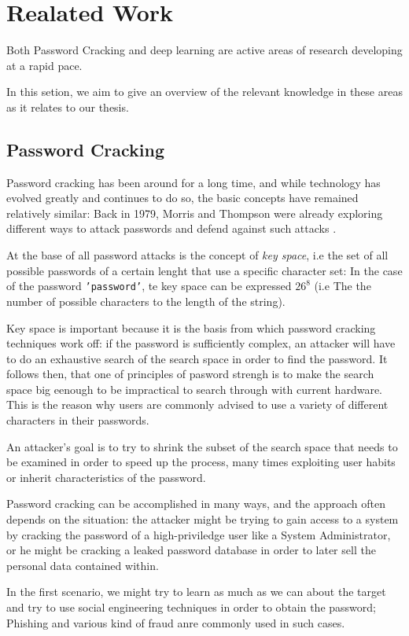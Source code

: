 \section{Realated Work}
Both Password Cracking and deep learning are active areas of research developing at a rapid pace.

In this setion, we aim to give an overview of the relevant knowledge in these areas as it relates to our thesis.

\subsection{Password Cracking}
Password cracking has been around for a long time, and while technology has evolved greatly and continues to do so, the basic concepts have remained relatively similar:
Back in 1979, Morris and Thompson were already exploring different ways to attack passwords and defend against such attacks \cite{Thompson1979}.

At the base of all password attacks is the concept of \emph{key space}, i.e the set of all possible passwords of a certain lenght that use a specific character set: In the case of the password \texttt{'password'}, te key space can be expressed $26^8$ (i.e The the number of possible characters to the length of the string).

Key space is important because it is the basis from which password cracking techniques work off: if the password is sufficiently complex, an attacker will have to do an exhaustive search of the search space in order to find the password. It follows then, that one of principles of pasword strengh is to make the search space big eenough to be impractical to search through with current hardware.
This is the reason why users are commonly advised to use a variety of different characters in their passwords.

An attacker's goal is to try to shrink the subset of the search space that needs to be examined in order to speed up the process, many times exploiting user habits or inherit characteristics of the password.

Password cracking can be accomplished in many ways, and the approach often depends on the situation: the attacker might be trying to gain access to a system by cracking the password of a high-priviledge user like a System Administrator, or he might be cracking a leaked password database in order to later sell the personal data contained within.

In the first scenario, we might try to learn as much as we can about the target and try to use social engineering techniques in order to obtain the password; Phishing and various kind of fraud anre commonly used in such cases.


